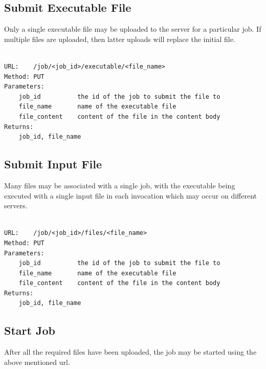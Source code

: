 \subsection{Submit Executable File}
\label{submitexecutablefile}

Only a single executable file may be uploaded to the server for a particular job. If multiple files are uploaded, then latter uploads will replace the initial file.

\begin{adjustwidth}{2.5em}{2.5em}
\begin{verbatim}

URL:    /job/<job_id>/executable/<file_name>    
Method: PUT
Parameters: 
    job_id          the id of the job to submit the file to
    file_name       name of the executable file
    file_content    content of the file in the content body
Returns:    
    job_id, file_name

\end{verbatim}
\end{adjustwidth}

\subsection{Submit Input File}
\label{submitinputfile}

Many files may be associated with a single job, with the executable being executed with a single input file in each invocation which may occur on different servers.

\begin{adjustwidth}{2.5em}{2.5em}
\begin{verbatim}

URL:    /job/<job_id>/files/<file_name>
Method: PUT
Parameters: 
    job_id          the id of the job to submit the file to
    file_name       name of the executable file
    file_content    content of the file in the content body
Returns:        
    job_id, file_name

\end{verbatim}
\end{adjustwidth}

\subsection{Start Job}
\label{startjob}

After all the required files have been uploaded, the job may be started using the above mentioned url.

